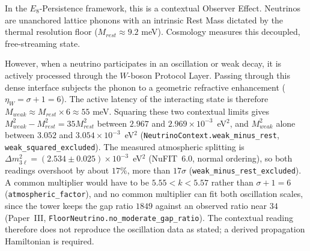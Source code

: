 In the $E_8$-Persistence framework, this is a contextual Observer Effect. Neutrinos are unanchored lattice phonons with an intrinsic Rest Mass dictated by the thermal resolution floor ($M_{rest} \approx 9.2$ meV). Cosmology measures this decoupled, free-streaming state. 

However, when a neutrino participates in an oscillation or weak decay, it is actively processed through the $W$-boson Protocol Layer. Passing through this dense interface subjects the phonon to a geometric refractive enhancement ($\eta_W = \sigma + 1 = 6$). The active latency of the interacting state is therefore $M_{weak} \approx M_{rest} \times 6 \approx 55$ meV. Squaring these two contextual limits gives $M_{weak}^2-M_{rest}^2=35M_{rest}^2$ between $2.967$ and $2.969\times10^{-3}$~eV$^2$, and $M_{weak}^2$ alone between $3.052$ and $3.054\times10^{-3}$~eV$^2$ (\texttt{NeutrinoContext.weak\_minus\_rest}, \texttt{weak\_squared\_excluded}). The measured atmospheric splitting is $\Delta m^2_{3\ell}=(2.534\pm0.025)\times10^{-3}$~eV$^2$ (NuFIT~6.0, normal ordering), so both readings overshoot by about $17\%$, more than $17\sigma$ (\texttt{weak\_minus\_rest\_excluded}). A common multiplier would have to be $5.55<k<5.57$ rather than $\sigma+1=6$ (\texttt{atmospheric\_factor}), and no common multiplier can fit both oscillation scales, since the tower keeps the gap ratio $1849$ against an observed ratio near $34$ (Paper~III, \texttt{FloorNeutrino.no\_moderate\_gap\_ratio}). The contextual reading therefore does not reproduce the oscillation data as stated; a derived propagation Hamiltonian is required.